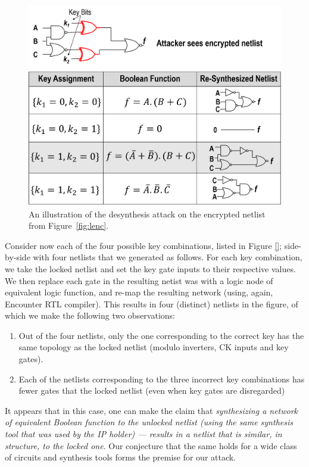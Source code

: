 \begin{figure}%
\centering
\includegraphics[width=0.9\columnwidth]{./figs/desynth.png}
\caption{An illustration of the desynthesis attack on the encrypted netlist from Figure~\ref{fig:lenc}. 
}
\label{fig:desynth}
\end{figure}

Consider now each of the four possible key combinations, listed in Figure \ref{}; side-by-side with four netlists that we generated as follows. For each key combination, we take the locked netlist and set the key gate inputs to their respective values. We then replace each gate in the resulting netist was with a logic node of equivalent logic function, and re-map the resulting network (using, again, Encounter RTL compiler). This results in four (distinct) netlists in the figure, of which we make the following two observations:

\begin{enumerate}
    \item Out of the four netlists, only the one corresponding to the correct key has the same topology as the locked netlist (modulo inverters, CK inputs and key gates).
    \item Each of the netlists corresponding to the three incorrect key combinations has fewer gates that the locked netlist (even when key gates are disregarded)
\end{enumerate}

It appears that in this case, one can make the claim that \emph{synthesizing a network of equivalent Boolean function to the unlocked netlist (using the same synthesis tool that was used by the IP holder) --- results in a netlist that is similar, \emph{in structure}, to the locked one}. Our conjecture that the same holds for a wide class of circuits and synthesis tools forms the premise for our attack.

